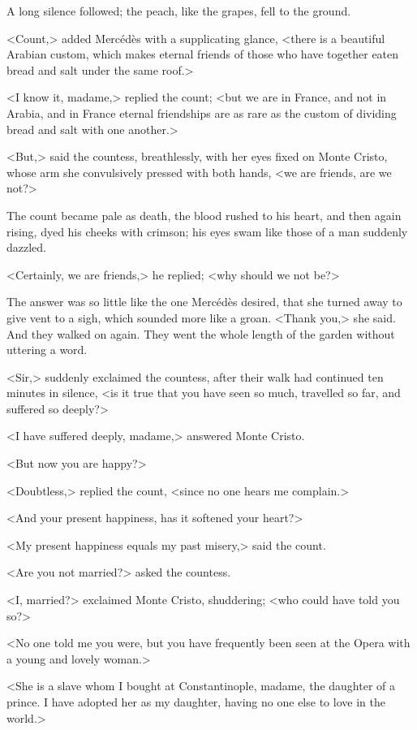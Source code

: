  A long silence followed; the peach, like the grapes, fell to the ground. 

 <Count,> added Mercédès with a supplicating glance, <there is a beautiful Arabian custom, which makes eternal friends of those who have together eaten bread and salt under the same roof.> 

 <I know it, madame,> replied the count; <but we are in France, and not in Arabia, and in France eternal friendships are as rare as the custom of dividing bread and salt with one another.> 

 <But,> said the countess, breathlessly, with her eyes fixed on Monte Cristo, whose arm she convulsively pressed with both hands, <we are friends, are we not?> 

 The count became pale as death, the blood rushed to his heart, and then again rising, dyed his cheeks with crimson; his eyes swam like those of a man suddenly dazzled. 

 <Certainly, we are friends,> he replied; <why should we not be?> 

 The answer was so little like the one Mercédès desired, that she turned away to give vent to a sigh, which sounded more like a groan. <Thank you,> she said. And they walked on again. They went the whole length of the garden without uttering a word. 

 <Sir,> suddenly exclaimed the countess, after their walk had continued ten minutes in silence, <is it true that you have seen so much, travelled so far, and suffered so deeply?> 

 <I have suffered deeply, madame,> answered Monte Cristo. 

 <But now you are happy?> 

 <Doubtless,> replied the count, <since no one hears me complain.> 

 <And your present happiness, has it softened your heart?> 

 <My present happiness equals my past misery,> said the count. 

 <Are you not married?> asked the countess. 

 <I, married?> exclaimed Monte Cristo, shuddering; <who could have told you so?> 

 <No one told me you were, but you have frequently been seen at the Opera with a young and lovely woman.> 

 <She is a slave whom I bought at Constantinople, madame, the daughter of a prince. I have adopted her as my daughter, having no one else to love in the world.> 

